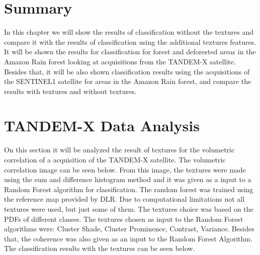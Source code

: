 
\section*{Summary}
In this chapter we will show the results of classification without the textures and compare it with the results of classification using the additional textures features. It will be shown the results for classification for forest and deforested areas in the Amazon Rain forest looking at acquisitions from the TANDEM-X satellite. Besides that, it will be also shown classification results using the acquisitions of the SENTINEL1 satellite for areas in the Amazon Rain forest, and compare the results with textures and without textures.



\section{TANDEM-X Data Analysis} 
\label{sec:gv2}
On this section it will be analyzed the result of textures for the volumetric correlation of a acquisition of the TANDEM-X satellite. The volumetric correlation image can be seen below.
From this image, the textures were made using the sum and difference histogram method and it was given as a input to a Random Forest algorithm for classification. The random forest was trained using the reference map provided by DLR. Due to computational limitations not all textures were used, but just some of them. The textures choice was based on the PDFs of different classes. The textures chosen as input to the Random Forest algorithms were: Cluster Shade, Cluster Prominence, Contrast, Variance. Besides that, the coherence was also given as an input to the Random Forest Algorithm. The classification results with the textures can be seen below.

